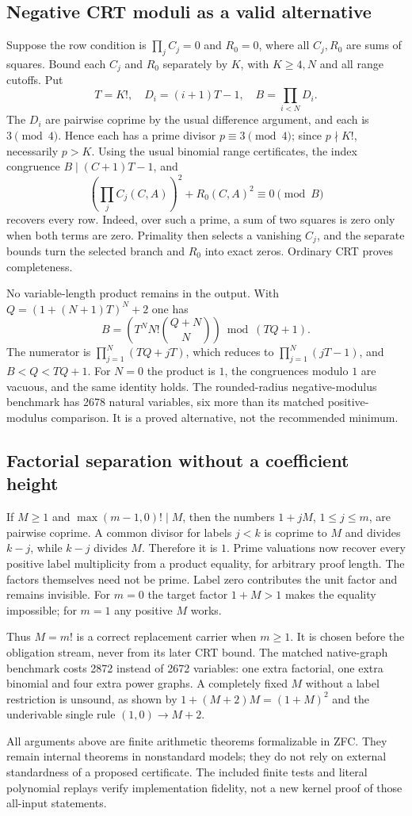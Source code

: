 \subsection{Negative CRT moduli as a valid alternative}

Suppose the row condition is $\prod_j C_j=0$ and $R_0=0$, where all
$C_j,R_0$ are sums of squares. Bound each $C_j$ and $R_0$ separately
by $K$, with $K\ge4,N$ and all range cutoffs. Put
\[
 T=K!,\quad D_i=(i+1)T-1,\quad B=\prod_{i<N}D_i.
\]
The $D_i$ are pairwise coprime by the usual difference argument, and each
is $3\pmod4$. Hence each has a prime divisor $p\equiv3\pmod4$;
since $p\nmid K!$, necessarily $p>K$.
Using the usual binomial range certificates, the index congruence
$B\mid(C+1)T-1$, and
\[
 \left(\prod_jC_j(C,A)\right)^2+R_0(C,A)^2\equiv0\pmod B
\]
recovers every row. Indeed, over such a prime, a sum of two squares is
zero only when both terms are zero. Primality then selects a vanishing
$C_j$, and the separate bounds turn the selected branch and $R_0$ into
exact zeros. Ordinary CRT proves completeness.

No variable-length product remains in the output. With
$Q=(1+(N+1)T)^N+2$ one has
\[
 B=\left(T^N N!\binom{Q+N}{N}\right)\bmod(TQ+1).
\]
The numerator is $\prod_{j=1}^N(TQ+jT)$, which reduces to
$\prod_{j=1}^N(jT-1)$, and $B<Q<TQ+1$. For $N=0$ the product is
$1$, the congruences modulo $1$ are vacuous, and the same identity holds.
The rounded-radius negative-modulus benchmark has 2678 natural variables,
six more than its matched positive-modulus comparison. It is a proved
alternative, not the recommended minimum.

\subsection{Factorial separation without a coefficient height}

If $M\ge1$ and $\max(m-1,0)!\mid M$, then the numbers
$1+jM$, $1\le j\le m$, are pairwise coprime. A common divisor for
labels $j<k$ is coprime to $M$ and divides $k-j$, while $k-j$ divides
$M$. Therefore it is $1$. Prime valuations now recover every positive
label multiplicity from a product equality, for arbitrary proof length.
The factors themselves need not be prime. Label zero contributes the
unit factor and remains invisible. For $m=0$ the target factor $1+M>1$
makes the equality impossible; for $m=1$ any positive $M$ works.

Thus $M=m!$ is a correct replacement carrier when $m\ge1$. It is
chosen before the obligation stream, never from its later CRT bound.
The matched native-graph benchmark costs 2872 instead of 2672 variables:
one extra factorial, one extra binomial and four extra power graphs.
A completely fixed $M$ without a label restriction is unsound, as shown by
$1+(M+2)M=(1+M)^2$ and the underivable single rule $(1,0)\to M+2$.

All arguments above are finite arithmetic theorems formalizable in ZFC.
They remain internal theorems in nonstandard models; they do not rely on
external standardness of a proposed certificate. The included finite tests
and literal polynomial replays verify implementation fidelity, not a new
kernel proof of those all-input statements.
